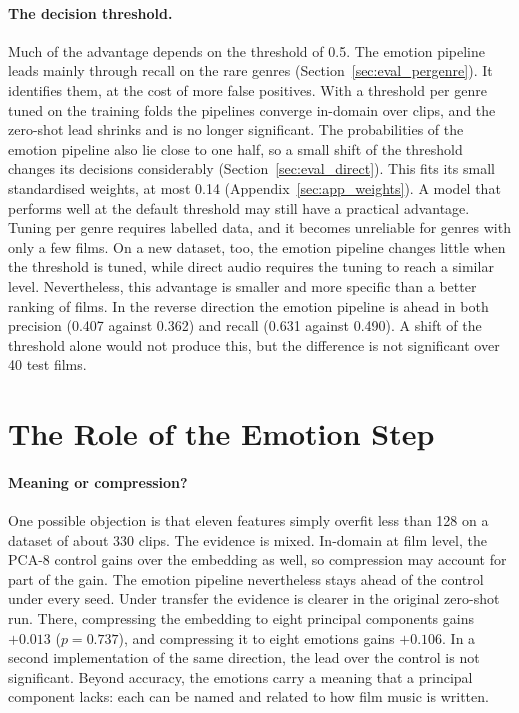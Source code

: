 \paragraph{The decision threshold.} Much of the advantage depends on the threshold of 0.5.
The emotion pipeline leads mainly through recall on the rare genres
(Section~\ref{sec:eval_pergenre}). It identifies them, at the cost of more false positives.
With a threshold per genre tuned on the training folds the pipelines converge in-domain over clips, and the zero-shot lead shrinks and is no longer significant. The probabilities of
the emotion pipeline also lie close to one half, so a small shift of the threshold changes its decisions considerably (Section~\ref{sec:eval_direct}). This fits its small standardised weights, at most 0.14 (Appendix~\ref{sec:app_weights}). A model that performs well at the default
threshold may still have a practical advantage. Tuning per genre requires labelled data, and it
becomes unreliable for genres with only a few films. On a new dataset, too, the
emotion pipeline changes little when the threshold is tuned, while direct audio requires the
tuning to reach a similar level. Nevertheless, this advantage is smaller and more specific than a better
ranking of films. In the reverse direction the emotion pipeline is ahead in both precision
(0.407 against 0.362) and recall (0.631 against 0.490). A shift of the threshold alone
would not produce this, but the difference is not significant over 40 test films.

\section{The Role of the Emotion Step}
\label{sec:disc_bottleneck}

\paragraph{Meaning or compression?} One possible objection is that eleven features simply overfit
less than 128 on a dataset of about 330 clips. The evidence is mixed. In-domain at film
level, the PCA-8 control gains over the embedding as well, so compression may account for part
of the gain. The emotion pipeline nevertheless stays ahead of the control under every seed. Under
transfer the evidence is clearer in the original zero-shot run. There, compressing the
embedding to eight principal components gains $+0.013$ ($p=0.737$), and compressing it to
eight emotions gains $+0.106$. In a second implementation of the same direction, the lead
over the control is not significant. Beyond accuracy, the emotions carry a meaning that a principal component lacks: each can be named and related to how film music is written.

